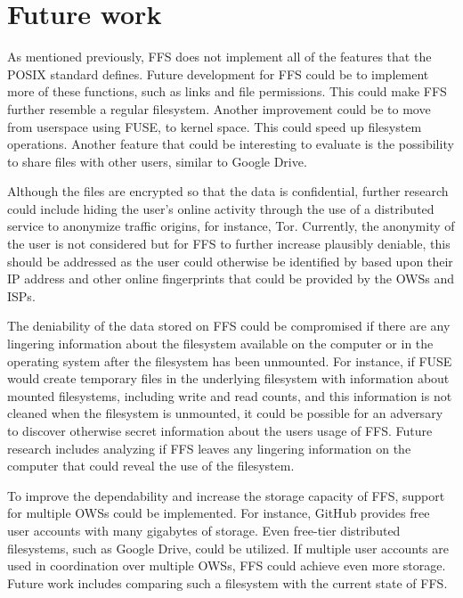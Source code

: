 
\section{Future work}
\label{sec:futureWork}
As mentioned previously, \gls{FFS} does not implement all of the features that the POSIX standard defines. Future development for \gls{FFS} could be to implement more of these functions, such as links and file permissions. This could make \gls{FFS} further resemble a regular filesystem. Another improvement could be to move from userspace using \gls{FUSE}, to kernel space. This could speed up filesystem operations. Another feature that could be interesting to evaluate is the possibility to share files with other users, similar to Google Drive.

Although the files are encrypted so that the data is confidential, further research could include hiding the user's online activity through the use of a distributed service to anonymize traffic origins, for instance, Tor. Currently, the anonymity of the user is not considered but for \gls{FFS} to further increase plausibly deniable, this should be addressed as the user could otherwise be identified by based upon their IP address and other online fingerprints that could be provided by the \glspl{OWS} and \glspl{ISP}.

The deniability of the data stored on \gls{FFS} could be compromised if there are any lingering information about the filesystem available on the computer or in the operating system after the filesystem has been unmounted. For instance, if \gls{FUSE} would create temporary files in the underlying filesystem with information about mounted filesystems, including write and read counts, and this information is not cleaned when the filesystem is unmounted, it could be possible for an adversary to discover otherwise secret information about the users usage of \gls{FFS}. Future research includes analyzing if \gls{FFS} leaves any lingering information on the computer that could reveal the use of the filesystem.

To improve the dependability and increase the storage capacity of \gls{FFS}, support for multiple \glspl{OWS} could be implemented. For instance, GitHub provides free user accounts with many gigabytes of storage. Even \mbox{free-tier} distributed filesystems, such as Google Drive, could be utilized. If multiple user accounts are used in coordination over multiple \glspl{OWS}, \gls{FFS} could achieve even more storage. Future work includes comparing such a filesystem with the current state of \gls{FFS}.


